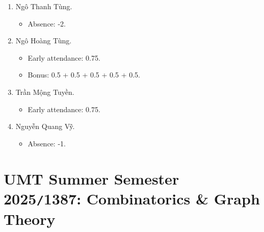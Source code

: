\documentclass{article}
\begin{document}
\begin{enumerate}
\begin{itemize}
	\end{itemize}
	\item {\sc Ngô Thanh Tùng.}
	\begin{itemize}
		\item Absence: -2.
	\end{itemize}
	\item {\sc Ngô Hoàng Tùng.}
	\begin{itemize}
		\item Early attendance: 0.75.
		\item Bonus: 0.5 + 0.5 + 0.5 + 0.5 + 0.5.
	\end{itemize}
	\item {\sc Trần Mộng Tuyền.}
	\begin{itemize}
		\item Early attendance: 0.75.
	\end{itemize}
	\item {\sc Nguyễn Quang Vỹ.}
		\begin{itemize}
			\item Absence: -1.
		\end{itemize}
\end{enumerate}


\section{UMT Summer Semester 2025{\tt/}1387: Combinatorics \& Graph Theory}
\end{document}
